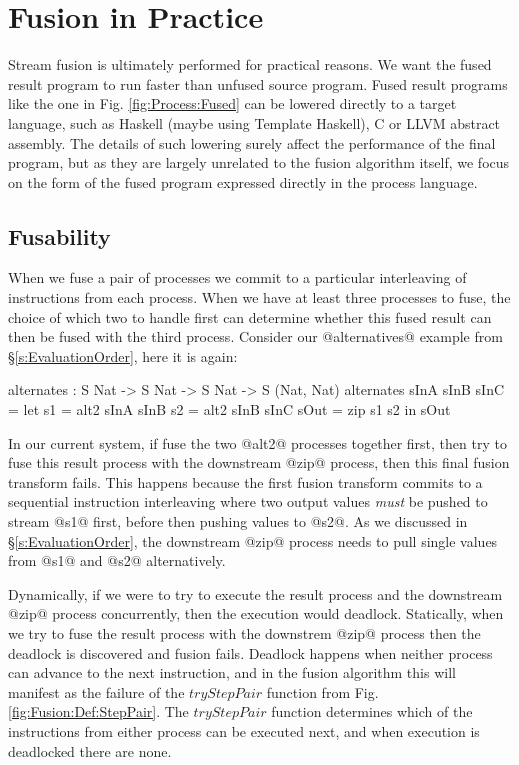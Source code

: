 
\section{Fusion in Practice}
\label{s:Evaluation}

Stream fusion is ultimately performed for practical reasons. We want the fused result program to run faster than unfused source program. Fused result programs like the one in Fig. \ref{fig:Process:Fused} can be lowered directly to a target language, such as Haskell (maybe using Template Haskell), C or LLVM abstract assembly. The details of such lowering surely affect the performance of the final program, but as they are largely unrelated to the fusion algorithm itself, we focus on the form of the fused program expressed directly in the process language.


\subsection{Fusability}
\label{s:FusionOrder}
When we fuse a pair of processes we commit to a particular interleaving of instructions from each process. When we have at least three processes to fuse, the choice of which two to handle first can determine whether this fused result can then be fused with the third process. Consider our @alternatives@ example from \S\ref{s:EvaluationOrder}, here it is again:
\begin{code}
  alternates : S Nat -> S Nat -> S Nat -> S (Nat, Nat)
  alternates sInA sInB sInC
   = let  s1   = alt2 sInA sInB
          s2   = alt2 sInB sInC
          sOut = zip s1 s2
     in   sOut
\end{code}

In our current system, if fuse the two @alt2@ processes together first, then try to fuse this result process with the downstream @zip@ process, then this final fusion transform fails. This happens because the first fusion transform commits to a sequential instruction interleaving where two output values \emph{must} be pushed to stream @s1@ first, before then pushing values to @s2@. As we discussed in \S\ref{s:EvaluationOrder}, the downstream @zip@ process needs to pull single values from @s1@ and @s2@ alternatively.

Dynamically, if we were to try to execute the result process and the downstream @zip@ process concurrently, then the execution would deadlock. Statically, when we try to fuse the result process with the downstrem @zip@ process then the deadlock is discovered and fusion fails. Deadlock happens when neither process can advance to the next instruction, and in the fusion algorithm this will manifest as the failure of the $tryStepPair$ function from Fig.\ref{fig:Fusion:Def:StepPair}. The $tryStepPair$ function determines which of the instructions from either process can be executed next, and when execution is deadlocked there are none.

